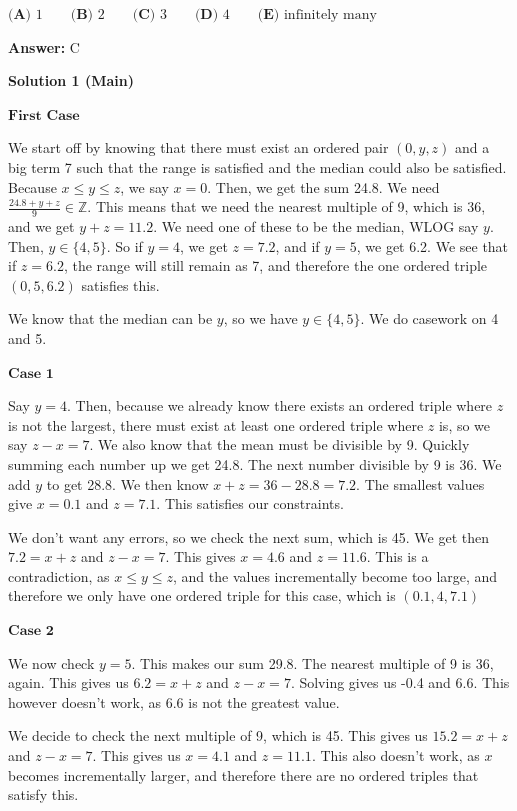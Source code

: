 \begin{enumerate}
 $\textbf{(A) }1 \qquad\textbf{(B) }2 \qquad\textbf{(C) }3 \qquad\textbf{(D) }4 \qquad\textbf{(E) }\text{infinitely many}\qquad$

 \textbf{Answer: }C



\textbf{Solution 1 (Main)}

$\textbf{First Case}$

 We start off by knowing that there must exist an ordered pair \( (0,y,z) \) and a big term 7 such that the range is satisfied and the median could also be satisfied. Because \( x \le y \le z \), we say \( x=0 \). Then, we get the sum 24.8. We need \( \frac{24.8 +y +z}{9} \in \mathbb{Z} \). This means that we need the nearest multiple of 9, which is 36, and we get \( y+z = 11.2 \). We need one of these to be the median, WLOG say \( y \). Then, \( y \in \{4,5\} \). So if \( y=4 \), we get \( z=7.2 \), and if \( y=5 \), we get 6.2. We see that if \( z=6.2 \), the range will still remain as 7, and therefore the one ordered triple \( (0,5,6.2) \) satisfies this.

 We know that the median can be \( y \), so we have \( y \in \{4,5\} \). We do casework on 4 and 5.

 $\textbf{Case 1}$

 Say \( y=4 \). Then, because we already know there exists an ordered triple where \( z \) is not the largest, there must exist at least one ordered triple where \( z \) is, so we say \( z-x=7 \). We also know that the mean must be divisible by 9. Quickly summing each number up we get 24.8. The next number divisible by 9 is 36. We add \( y \) to get 28.8. We then know \( x+z=36-28.8=7.2 \). The smallest values give \( x=0.1 \) and \( z=7.1 \). This satisfies our constraints.

 We don't want any errors, so we check the next sum, which is 45. We get then \( 7.2=x+z \) and \( z-x=7 \). This gives \( x=4.6 \) and \( z=11.6 \). This is a contradiction, as \( x \le y \le z \), and the values incrementally become too large, and therefore we only have one ordered triple for this case, which is \( (0.1,4,7.1) \)

 $\textbf{Case 2}$

 We now check \( y=5 \). This makes our sum 29.8. The nearest multiple of 9 is 36, again. This gives us \( 6.2 = x+z \) and \( z-x=7 \). Solving gives us -0.4 and 6.6. This however doesn't work, as 6.6 is not the greatest value.

 We decide to check the next multiple of 9, which is 45. This gives us \( 15.2 = x+z \) and \( z-x=7 \). This gives us \( x=4.1 \) and \( z=11.1 \). This also doesn't work, as \( x \) becomes incrementally larger, and therefore there are no ordered triples that satisfy this.


\end{enumerate}
